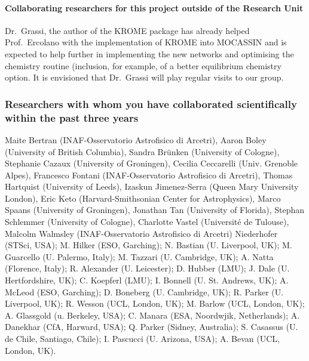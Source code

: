 \documentclass[10pt,fleqn,twoside]{article}
\begin{document}

\paragraph{Collaborating researchers for this project outside of
  the Research Unit}

Dr.\ Grassi, the author of the KROME package has already helped Prof.\ Ercolano with the implementation of KROME into MOCASSIN and is expected to help further in implementing the new networks and optimising the chemistry routine (inclusion, for example, of a better equilibrium chemistry option. 
It is envisioned that Dr.\ Grassi will play regular visits to our group.    

\subsubsection{Researchers with whom you have collaborated scientifically within the past three years}

Maite Bertran (INAF-Osservatorio Astrofisico di Arcetri), Aaron Boley (University of British Columbia), Sandra Brünken (University of Cologne), Stephanie Cazaux (University of Groningen), Cecilia Ceccarelli (Univ. Grenoble Alpes), Francesco Fontani (INAF-Osservatorio Astrofisico di Arcetri), Thomas Hartquist (University of Leeds), Izaskun Jimenez-Serra (Queen Mary University London), Eric Keto (Harvard-Smithsonian Center for Astrophysics), Marco Spaans (University of Groningen), Jonathan Tan (University of Florida), Stephan Schlemmer (University of Cologne), Charlotte Vastel (Université de Tulouse), Malcolm Walmsley (INAF-Osservatorio Astrofisico di Arcetri)
 Niederhofer (STSci, USA); M. Hilker (ESO, Garching); N. Bastian (U. Liverpool,
UK); M. Guarcello (U. Palermo, Italy); M. Tazzari (U. Cambridge, UK);
A. Natta (Florence, Italy); R. Alexander (U. Leicester); D. Hubber
(LMU); J. Dale (U. Hertfordshire, UK); C. Koepferl (LMU); I. Bonnell
(U. St. Andrews, UK); A. McLeod (ESO, Garching); D. Boneberg
(U. Cambridge, UK); R. Parker (U. Liverpool, UK); R. Wesson (UCL,
London, UK); M. Barlow (UCL, London, UK); A. Glassgold (u. Berkeley,
USA); C. Manara (ESA, Noordwjik, Netherlands); A. Danekhar (CfA,
Harward, USA); Q. Parker (Sidney, Australia); S. Casassus
(U. de Chile, Santiago, Chile); I. Pascucci (U. Arizona, USA);
A. Bevan (UCL, London, UK).
\end{document}
